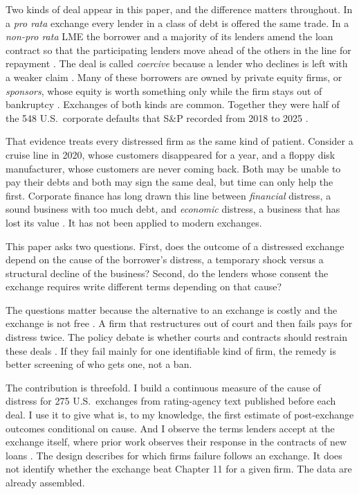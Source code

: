 \documentclass[12pt]{article}
\begin{document}
Two kinds of deal appear in this paper, and the difference matters throughout. In a \emph{pro rata} exchange every lender in a class of debt is offered the same trade. In a \emph{non-pro rata} LME the borrower and a majority of its lenders amend the loan contract so that the participating lenders move ahead of the others in the line for repayment \citep{roerotaru2026}. The deal is called \emph{coercive} because a lender who declines is left with a weaker claim \citep{buccolakahan2025}. Many of these borrowers are owned by private equity firms, or \emph{sponsors}, whose equity is worth something only while the firm stays out of bankruptcy \citep{buccola2023}. Exchanges of both kinds are common. Together they were half of the 548 U.S.\ corporate defaults that S\&P recorded from 2018 to 2025 \citep{spdefault}.

That evidence treats every distressed firm as the same kind of patient. Consider a cruise line in 2020, whose customers disappeared for a year, and a floppy disk manufacturer, whose customers are never coming back. Both may be unable to pay their debts and both may sign the same deal, but time can only help the first. Corporate finance has long drawn this line between \emph{financial} distress, a sound business with too much debt, and \emph{economic} distress, a business that has lost its value \citep{wruck1990, andrade1998}. It has not been applied to modern exchanges.

This paper asks two questions. First, does the outcome of a distressed exchange depend on the cause of the borrower's distress, a temporary shock versus a structural decline of the business? Second, do the lenders whose consent the exchange requires write different terms depending on that cause?

The questions matter because the alternative to an exchange is costly \citep{antill2026} and the exchange is not free \citep{elkamhi2024}. A firm that restructures out of court and then fails pays for distress twice. The policy debate is whether courts and contracts should restrain these deals \citep{ellias2020, buccolakahan2025}. If they fail mainly for one identifiable kind of firm, the remedy is better screening of who gets one, not a ban.

The contribution is threefold. I build a continuous measure of the cause of distress for 275 U.S.\ exchanges from rating-agency text published before each deal. I use it to give what is, to my knowledge, the first estimate of post-exchange outcomes conditional on cause. And I observe the terms lenders accept at the exchange itself, where prior work observes their response in the contracts of new loans \citep{buccolanini2024, badawi2024, ivashina2025}. The design describes for which firms failure follows an exchange. It does not identify whether the exchange beat Chapter 11 for a given firm. The data are already assembled.
\end{document}
